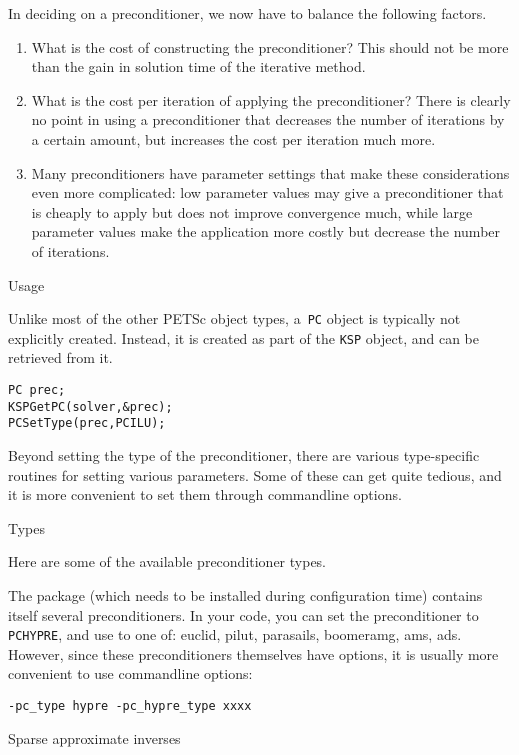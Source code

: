 In deciding on a preconditioner, we now have to balance the following factors.
\begin{enumerate}
\item What is the cost of constructing the preconditioner? This should
  not be more than the gain in solution time of the iterative method.
\item What is the cost per iteration of applying the preconditioner?
  There is clearly no point in using a preconditioner that decreases
  the number of iterations by a certain amount, but increases the cost
  per iteration much more.
\item Many preconditioners have parameter settings that make these
  considerations even more complicated: low parameter values may give
  a preconditioner that is cheaply to apply but does not improve
  convergence much, while large parameter values make the application
  more costly but decrease the number of iterations.
\end{enumerate}

 {Usage}

Unlike most of the other PETSc object types, a~\lstinline{PC} object
is typically not explicitly created. Instead, it is created as part of
the \lstinline{KSP} object, and can be retrieved from it.

\begin{lstlisting}
PC prec;
KSPGetPC(solver,&prec);
PCSetType(prec,PCILU);
\end{lstlisting}

Beyond setting the type of the preconditioner, there are various
type-specific routines for setting various parameters. Some of these
can get quite tedious, and it is more convenient to set them through
commandline options.

 {Types}

Here are some of the available preconditioner types.

The  package
(which needs to be installed during configuration time)
contains itself several preconditioners.
In your code, you can set the preconditioner to \lstinline{PCHYPRE},
and use  to one of:
euclid, pilut, parasails, boomeramg, ams, ads.
However, since these preconditioners themselves have options,
it is usually more convenient to use commandline options:
\begin{verbatim}
-pc_type hypre -pc_hypre_type xxxx
\end{verbatim}

 {Sparse approximate inverses}

